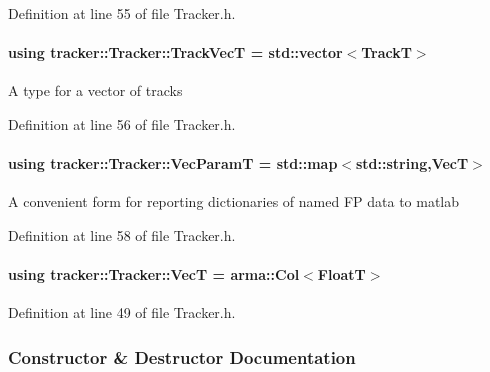 Definition at line 55 of file Tracker.\+h.

\paragraph[{\texorpdfstring{Track\+VecT}{TrackVecT}}]{\setlength{\rightskip}{0pt plus 5cm}using {\bf tracker\+::\+Tracker\+::\+Track\+VecT} =  std\+::vector$<${\bf TrackT}$>$}\hypertarget{classtracker_1_1Tracker_a25ee8479eb10f1619a8eefd5d310eeb7}{}\label{classtracker_1_1Tracker_a25ee8479eb10f1619a8eefd5d310eeb7}
A type for a vector of tracks 

Definition at line 56 of file Tracker.\+h.

\paragraph[{\texorpdfstring{Vec\+ParamT}{VecParamT}}]{\setlength{\rightskip}{0pt plus 5cm}using {\bf tracker\+::\+Tracker\+::\+Vec\+ParamT} =  std\+::map$<$std\+::string,{\bf VecT}$>$}\hypertarget{classtracker_1_1Tracker_a1a79f7073d8e1a032369dcc8105604ce}{}\label{classtracker_1_1Tracker_a1a79f7073d8e1a032369dcc8105604ce}
A convenient form for reporting dictionaries of named FP data to matlab 

Definition at line 58 of file Tracker.\+h.

\paragraph[{\texorpdfstring{VecT}{VecT}}]{\setlength{\rightskip}{0pt plus 5cm}using {\bf tracker\+::\+Tracker\+::\+VecT} =  arma\+::\+Col$<${\bf FloatT}$>$}\hypertarget{classtracker_1_1Tracker_a9905fa9b81b252716e651d87d7d57aff}{}\label{classtracker_1_1Tracker_a9905fa9b81b252716e651d87d7d57aff}


Definition at line 49 of file Tracker.\+h.



\subsubsection{Constructor \& Destructor Documentation}
